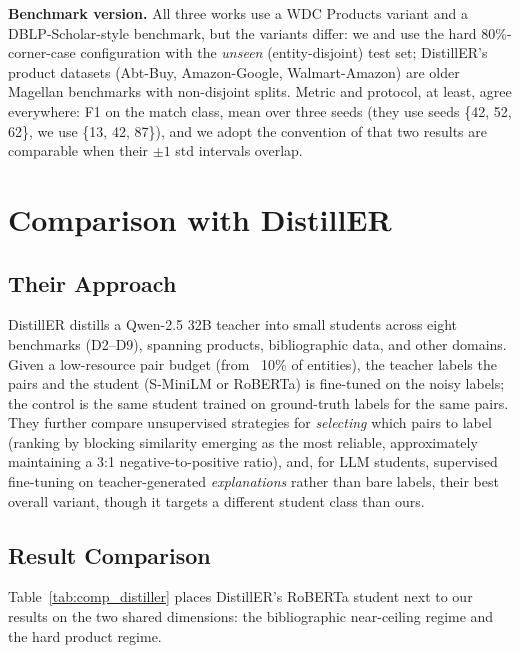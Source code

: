 \documentclass[a4paper,oneside,bibliography=totoc]{scrbook}
\begin{document}
\textbf{Benchmark version.} All three works use a WDC Products variant and a DBLP-Scholar-style benchmark, but the variants differ: we and \citet{steiner2026labeling} use the hard 80\%-corner-case configuration with the \emph{unseen} (entity-disjoint) test set; DistillER's product datasets (Abt-Buy, Amazon-Google, Walmart-Amazon) are older Magellan benchmarks with non-disjoint splits. Metric and protocol, at least, agree everywhere: F1 on the match class, mean over three seeds (they use seeds \{42, 52, 62\}, we use \{13, 42, 87\}), and we adopt the convention of \citet{steiner2026labeling} that two results are comparable when their $\pm 1$ std intervals overlap.

\section{Comparison with DistillER}
\label{sec:comp_distiller}

\subsection{Their Approach}
\label{sec:comp_distiller_approach}

DistillER \cite{zeakis2026distiller} distills a Qwen-2.5 32B teacher into small students across eight benchmarks (D2--D9), spanning products, bibliographic data, and other domains. Given a low-resource pair budget (from ~10\% of entities), the teacher labels the pairs and the student (S-MiniLM or RoBERTa) is fine-tuned on the noisy labels; the control is the same student trained on ground-truth labels for the same pairs. They further compare unsupervised strategies for \emph{selecting} which pairs to label (ranking by blocking similarity emerging as the most reliable, approximately maintaining a 3:1 negative-to-positive ratio), and, for LLM students, supervised fine-tuning on teacher-generated \emph{explanations} rather than bare labels, their best overall variant, though it targets a different student class than ours.

\subsection{Result Comparison}
\label{sec:comp_distiller_results}

Table~\ref{tab:comp_distiller} places DistillER's RoBERTa student next to our results on the two shared dimensions: the bibliographic near-ceiling regime and the hard product regime.
\end{document}

